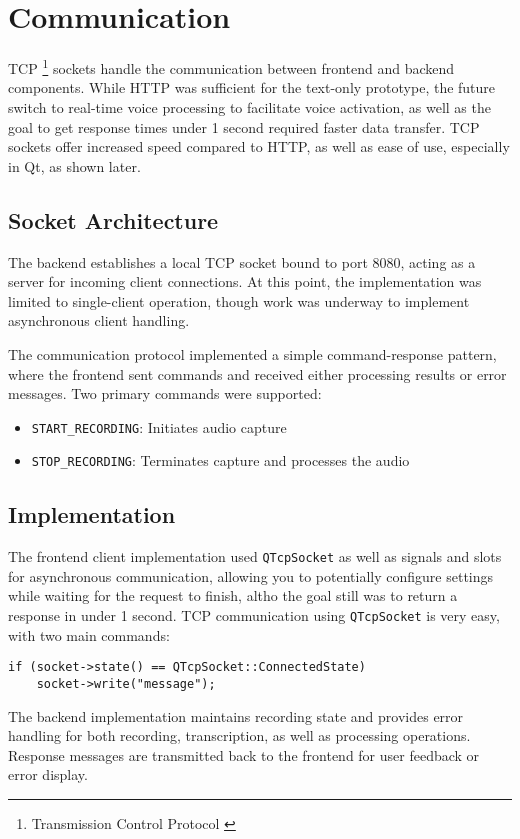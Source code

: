 \section{Communication}
TCP \footnote{Transmission Control Protocol \cite{tcp}} sockets handle the communication between frontend and backend components.
While HTTP was sufficient for the text-only prototype, the future switch to real-time
voice processing to facilitate voice activation, as well as the goal to get response times
under 1 second required faster data transfer. TCP sockets offer increased speed compared to
HTTP, as well as ease of use, especially in Qt, as shown later.

\subsection{Socket Architecture}
The backend establishes a local TCP socket bound to port 8080,
acting as a server for incoming client connections.
At this point, the implementation was limited to single-client operation,
though work was underway to implement asynchronous client handling.

The communication protocol implemented a simple command-response pattern,
where the frontend sent commands and received either processing results or error messages.
Two primary commands were supported:

\begin{itemize}
    \item \texttt{START\_RECORDING}: Initiates audio capture
    \item \texttt{STOP\_RECORDING}: Terminates capture and processes the audio
\end{itemize}

\subsection{Implementation}
The frontend client implementation used \texttt{QTcpSocket} as well as signals and slots for asynchronous communication,
allowing you to potentially configure settings while waiting for the request to finish, altho the goal
still was to return a response in under 1 second.
TCP communication using \texttt{QTcpSocket} is very easy, with two main commands:

\begin{verbatim}
if (socket->state() == QTcpSocket::ConnectedState)
    socket->write("message");
\end{verbatim}

The backend implementation maintains recording state and provides error handling for
both recording, transcription, as well as processing operations. Response messages are transmitted
back to the frontend for user feedback or error display.
